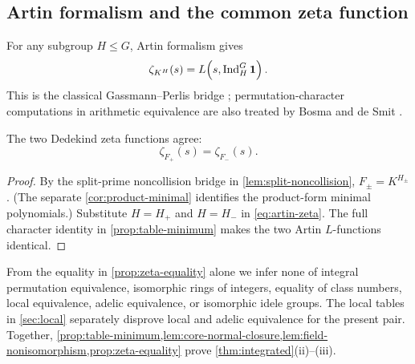 \subsection{Artin formalism and the common zeta function}

For any subgroup $H\leq G$, Artin formalism gives
\begin{equation}
 \zeta_{K^H}(s)=L\!\left(s,\operatorname{Ind}_H^G\mathbf{1}\right).
 \label{eq:artin-zeta}
\end{equation}
This is the classical Gassmann--Perlis bridge
\citep[Theorem~1]{perlis1977equation}; permutation-character computations
in arithmetic equivalence are also treated by Bosma and de Smit
\citep[printed p.~68]{bosmadesmit2002small}.

\begin{proposition}
\label{prop:zeta-equality}
The two Dedekind zeta functions agree:
\[
 \zeta_{F_+}(s)=\zeta_{F_-}(s).
\]
\end{proposition}

\begin{proof}
By the split-prime noncollision bridge in
\cref{lem:split-noncollision}, $F_\pm=K^{H_\pm}$.  (The separate
\cref{cor:product-minimal} identifies the product-form minimal
polynomials.)  Substitute
$H=H_+$ and $H=H_-$ in \eqref{eq:artin-zeta}.  The full character identity
in \cref{prop:table-minimum} makes the two Artin $L$-functions identical.
\end{proof}

From the equality in \cref{prop:zeta-equality} alone we infer none of integral
permutation equivalence, isomorphic rings of integers, equality of class
numbers, local equivalence, adelic equivalence, or isomorphic idele groups.
The local tables in \cref{sec:local} separately disprove local and adelic
equivalence for the present pair.  Together,
\cref{prop:table-minimum,lem:core-normal-closure,lem:field-nonisomorphism,prop:zeta-equality}
prove \cref{thm:integrated}(ii)--(iii).
